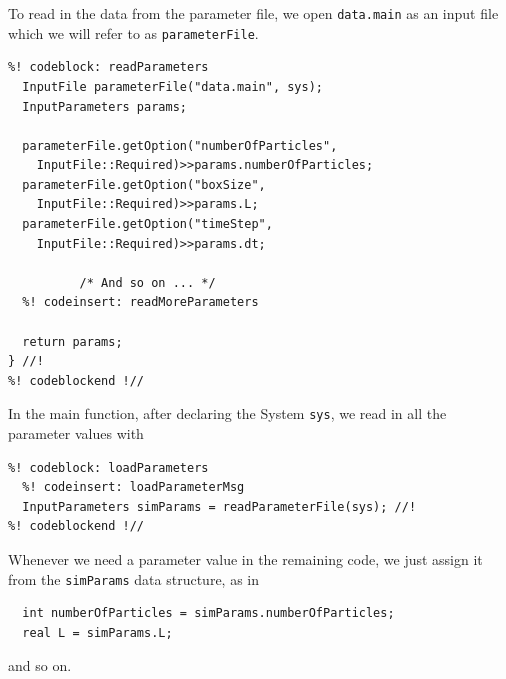 To read in the data from the parameter file, we open \texttt{data.main} as an
input file which we will refer to as \texttt{parameterFile}.
\begin{lstlisting}
%! codeblock: readParameters
  InputFile parameterFile("data.main", sys);
  InputParameters params;

  parameterFile.getOption("numberOfParticles",
    InputFile::Required)>>params.numberOfParticles;
  parameterFile.getOption("boxSize",
    InputFile::Required)>>params.L;
  parameterFile.getOption("timeStep",
    InputFile::Required)>>params.dt;

          /* And so on ... */
  %! codeinsert: readMoreParameters

  return params;
} //!
%! codeblockend !//
\end{lstlisting}

In the main function, after declaring the System \texttt{sys}, we read in all
the parameter values with
\begin{lstlisting}
%! codeblock: loadParameters
  %! codeinsert: loadParameterMsg
  InputParameters simParams = readParameterFile(sys); //!
%! codeblockend !//
\end{lstlisting}
Whenever we need a parameter value in the remaining code, we just assign it from
the \texttt{simParams} data structure, as in
\begin{lstlisting}
  int numberOfParticles = simParams.numberOfParticles;
  real L = simParams.L;
\end{lstlisting}
and so on.

